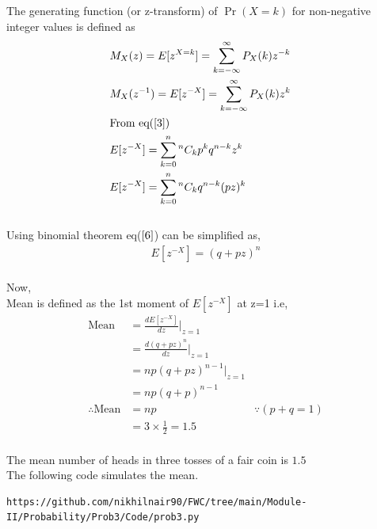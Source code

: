 \documentclass[journal,12pt,twocolumn]{IEEEtran}
\providecommand{\pr}[1]{\ensuremath{\Pr\left(#1\right)}}
\begin{document}
The generating function (or z-transform) of $\pr{X =k}$ for non-negative integer values is defined as 
\\
\begin{align}
&M_X(z) = E[z^{X=k}] = \sum_{k=-\infty}^{\infty} P_X(k)z^{-k}&
\\
&M_X(z^{-1}) = E[z^{-X}] = \sum_{k=-\infty}^{\infty} P_X(k) z^{k}&
\\
&\text{From eq} (\ref{3})&  \nonumber
\\
&E[z^{-X}] = \sum_{k=0}^{n}  {}^nC_kp^{k} q^{n-k} z^{k}&
\\
&E[z^{-X}] = \sum_{k=0}^{n} {}^nC_k  q^{n-k}(pz)^{k}&      \label{6}
\end{align}
\\
Using binomial theorem eq($\ref{6}$) can be simplified as,
\\
\begin{align}
E[z^{-X}]= (q + pz)^n
\end{align}
\\
Now,\\
Mean is defined as the 1st moment of $E[z^{-X}]$ at z=1 i.e,
\begin{align}
\text{Mean}&= \frac{dE[z^{-X}]}{dz}|_{z=1}&
\\
&= \frac{d(q + pz)^n}{dz}|_{z=1}&
\\
&=np(q + pz)^{n-1}|_{z=1}&
\\
&= np(q + p)^{n-1}&
\\
\therefore \text{Mean} &= np& {}\because(p+q=1)
\\
&= 3\times\frac{1}{2}= 1.5&
\end{align}
\\

The mean number of heads in three tosses of a fair coin is $1.5$
\\

The following code simulates the mean.

\begin{lstlisting}
https://github.com/nikhilnair90/FWC/tree/main/Module-II/Probability/Prob3/Code/prob3.py
\end{lstlisting}
\end{document}
